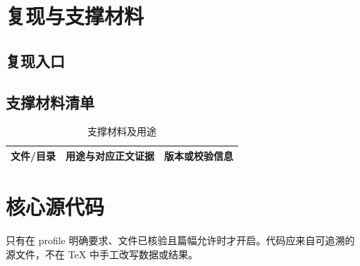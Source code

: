 
\section{复现与支撑材料}

\subsection{复现入口}

\subsection{支撑材料清单}
\begin{table}[H]
  \centering
  \caption{支撑材料及用途}
  \label{tab:supporting-materials}
  \begin{tabularx}{0.96\textwidth}{l X l}
    \toprule
    文件/目录 & 用途与对应正文证据 & 版本或校验信息 \\
    \midrule
    \bottomrule
  \end{tabularx}
\end{table}

\ifmmIncludeCodeAppendix
  \section{核心源代码}
  只有在 profile 明确要求、文件已核验且篇幅允许时才开启。代码应来自可追溯的源文件，不在 TeX 中手工改写数据或结果。
\fi
